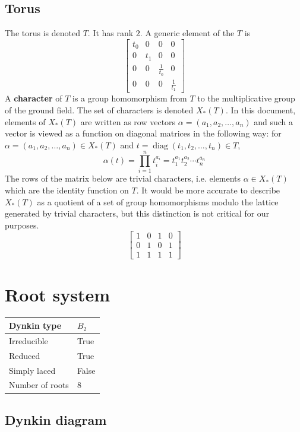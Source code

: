 \documentclass[11pt]{article}
\newcommand{\tbf}{\textbf}
\DeclareMathOperator{\diag}{diag}
\theoremstyle{definition}
\begin{document}
\subsection{Torus}

The torus is denoted $T$. It has rank $2$. A generic element of the $T$ is
\[
\left[\begin{matrix}t_{0} & 0 & 0 & 0\\0 & t_{1} & 0 & 0\\0 & 0 & \frac{1}{t_{0}} & 0\\0 & 0 & 0 & \frac{1}{t_{1}}\end{matrix}\right]
\]
A \tbf{character} of $T$ is a group homomorphism from $T$ to the multiplicative group of the ground field. The set of characters is denoted $X_*(T)$. In this document, elements of $X_*(T)$ are written as row vectors $\alpha = (a_1, a_2, \ldots, a_n)$ and such a vector is viewed as a function on diagonal matrices in the following way: for $\alpha = (a_1, a_2, \ldots, a_n) \in X_*(T)$ and $t = \diag(t_1, t_2, \ldots, t_n) \in T$, 
\[
	\alpha(t) = \prod_{i=1}^n t_i^{a_i} = t_1^{a_1} t_2^{a_2} \cdots t_n^{a_n}
\]
The rows of the matrix below are trivial characters, i.e. elements $\alpha \in X_*(T)$ which are the identity function on $T$. It would be more accurate to describe $X_*(T)$ as a quotient of a set of group homomorphisms modulo the lattice generated by trivial characters, but this distinction is not critical for our purposes.
\[
\left[\begin{matrix}1 & 0 & 1 & 0\\0 & 1 & 0 & 1\\1 & 1 & 1 & 1\end{matrix}\right]
\]

\newpage
\section{Root system}

\begin{tabular}{|l|l|}
	\hline
    Dynkin type & $B_2$ \\
	\hline
    Irreducible & True \\
	\hline
    Reduced & True \\
	\hline
	Simply laced & False \\
	\hline
	Number of roots & $8$ \\
	\hline
\end{tabular}

\subsection{Dynkin diagram}
\end{document}
